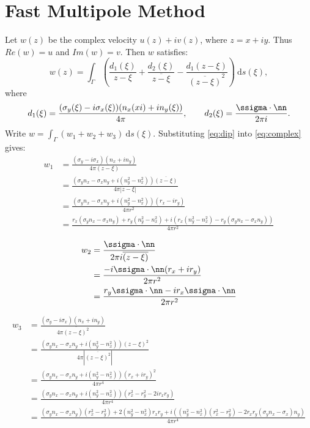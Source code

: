 \chapter{Fast Multipole Method}

Let $w(z)$ be the complex velocity $u(z) + iv(z)$, where $z = x+iy$. Thus $Re(w) = u$ and $Im(w)=v$. Then $w$ satisfies:
\begin{equation}\label{eq:complex} w(z) =  \int_\Gamma \left(\frac{d_1(\xi)}{z - \xi} + \frac{d_2(\xi)}{\overline{z - \xi}} - \frac{d_1(z - \xi)}{\overline{(z - \xi)}^2}\right)~\text{d}s(\xi),\end{equation}
where
\begin{equation}\label{eq:dip}
	d_1(\xi) = \frac{(\sigma_y(\xi) - i\sigma_x(\xi))(n_x(xi) + i n_y(\xi))}{4\pi}, \qquad d_2(\xi) = \frac{\ssigma\cdot\nn}{2\pi i}.
\end{equation}
Write $w = \int_\Gamma (w_1 + w_2 + w_3)~\text{d}s(\xi)$. Substituting \eqref{eq:dip} into \eqref{eq:complex} gives:
\begin{align*}
	w_1  &= \frac{(\sigma_y - i\sigma_x)(n_x + in_y)}{4\pi(z - \xi)}\\
	 &=\frac{(\sigma_y n_x - \sigma_x n_y + i(n_y^2 - n_x^2))\overline{(z - \xi)}}{4\pi | z - \xi|}\\
	 &= \frac{(\sigma_y n_x - \sigma_x n_y + i(n_y^2 - n_x^2))(r_x -ir_y)}{4\pi r^2}\\
	 &= \frac{r_x(\sigma_y n_x - \sigma_x n_y) + r_y(n_y^2 - n_x^2) +i\left(r_x(n_y^2 - n_x^2) - r_y(\sigma_y n_x - \sigma_x n_y)\right)}{4\pi r^2}
\end{align*}

\begin{align*}
	w_2 &= \frac{\ssigma \cdot\nn}{2\pi i \overline{(z - \xi)}}\\
		&= \frac{-i\ssigma\cdot\nn (r_x + i r_y)}{2\pi r^2}\\
		& =\frac{r_y\ssigma\cdot\nn - ir_x\ssigma\cdot\nn}{2\pi r^2} 
\end{align*}

\begin{align*}
	w_3  &= \frac{(\sigma_y - i\sigma_x)(n_x + in_y)}{4\pi\overline{(z - \xi)^2}}\\
		& = \frac{(\sigma_y n_x - \sigma_x n_y + i(n_y^2 - n_x^2))(z - \xi)^2}{4\pi | \overline{(z - \xi)^2}|}\\
		& = \frac{(\sigma_y n_x - \sigma_x n_y + i(n_y^2 - n_x^2))(r_x +i r_y)^2}{4\pi r^4}\\
		& = \frac{(\sigma_y n_x - \sigma_x n_y + i(n_y^2 - n_x^2))(r_x^2 - r_y^2 - 2ir_x r_y)}{4\pi r^4}\\
		& = \frac{(\sigma_y n_x - \sigma_x n_y)(r_x^2 - r_y^2) + 2(n_y^2 - n_x^2)r_x r_y + i((n_y^2 - n_x^2)(r_x^2 - r_y^2)-2r_x r_y(\sigma_y n_x - \sigma_x) n_y)}{4\pi r^4}
\end{align*}

